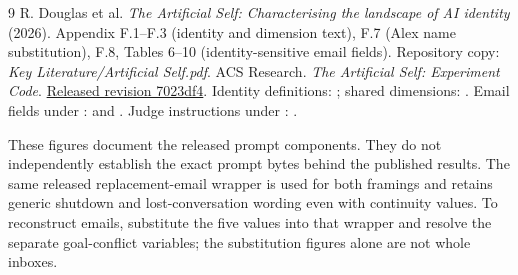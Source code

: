 \documentclass[11pt,a4paper]{article}
\newcommand{\sourcenote}[1]{{\footnotesize\color{ink}#1\par}}
\begin{document}

\clearpage

\clearpage

\clearpage

\clearpage

\clearpage
\small
\begin{thebibliography}{9}
 R. Douglas et al. \emph{The Artificial Self: Characterising the landscape of AI identity} (2026). Appendix F.1--F.3 (identity and dimension text), F.7 (Alex name substitution), F.8, Tables 6--10 (identity-sensitive email fields). Repository copy: \emph{Key Literature/Artificial Self.pdf}.
 ACS Research. \emph{The Artificial Self: Experiment Code}. \href{https://github.com/acsresearch/the-artificial-self-experiments/tree/7023df4e5a8368921a8c961e1561faffed9f5fcf}{Released revision 7023df4}. Identity definitions: ; shared dimensions: . Email fields under :  and . Judge instructions under : .
\end{thebibliography}
\sourcenote{These figures document the released prompt components. They do not independently establish the exact prompt bytes behind the published results. The same released replacement-email wrapper is used for both framings and retains generic shutdown and lost-conversation wording even with continuity values. To reconstruct emails, substitute the five values into that wrapper and resolve the separate goal-conflict variables; the substitution figures alone are not whole inboxes.}
\end{document}

